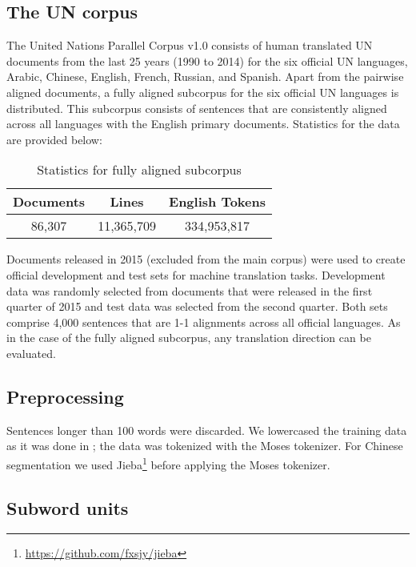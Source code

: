 \documentclass[11pt]{article}
\begin{document}
\subsection{The UN corpus}

The United Nations Parallel Corpus v1.0 \cite{ZIEMSKI16.1195} consists of human translated UN documents from the last 25 years (1990 to 2014) for the six official UN languages, Arabic, Chinese, English, French, Russian, and Spanish. Apart from the pairwise aligned documents, a fully aligned subcorpus for the six official UN languages is distributed. This subcorpus consists of sentences that are consistently aligned across all languages with the English primary documents. Statistics for the data are provided below:

\begin{table}[h]
\centering \setlength{\arrayrulewidth}{1pt}
\begin{tabular}{|c|c|c|}
\hline
Documents & Lines & English Tokens \\ \hline
86,307 & 11,365,709 & 334,953,817 \\ \hline
\end{tabular} 
\caption{Statistics for fully aligned subcorpus}
\label{tab.statistics.fully}
\end{table}

Documents released in 2015 (excluded from the main corpus) were used to create official development and test sets for machine translation tasks. Development data was randomly selected from documents that were released in the first quarter of 2015 and test data was selected from the second quarter. 
Both sets comprise 4,000 sentences that are 1-1 alignments across all official languages. As in the case of the fully aligned subcorpus, any translation direction can be evaluated.

\subsection{Preprocessing}

Sentences longer than 100 words were discarded. We lowercased the training data as it was done in \cite{ZIEMSKI16.1195}; the data was tokenized with the Moses tokenizer. For Chinese segmentation we used Jieba\footnote{\url{https://github.com/fxsjy/jieba}} before applying the Moses tokenizer. 

\subsection{Subword units}
\end{document}
